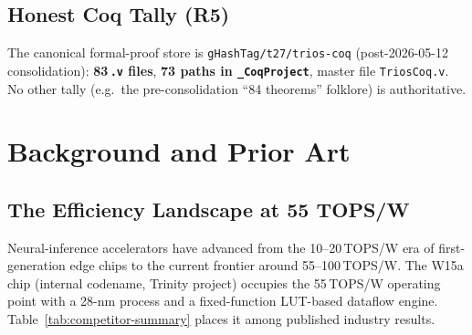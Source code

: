 \subsection{Honest Coq Tally (R5)}

The canonical formal-proof store is
\texttt{gHashTag/t27/trios-coq} (post-2026-05-12 consolidation):
\textbf{83\,\texttt{.v} files}, \textbf{73 paths in \texttt{\_CoqProject}},
master file \texttt{TriosCoq.v}.
No other tally (e.g.\ the pre-consolidation ``84 theorems'' folklore) is authoritative.

\section{Background and Prior Art}
\label{sec:flos77-background}

\subsection{The Efficiency Landscape at 55 TOPS/W}

Neural-inference accelerators have advanced from the 10--20\,TOPS/W era of
first-generation edge chips to the current frontier around 55--100\,TOPS/W.
The W15a chip (internal codename, Trinity project) occupies the 55\,TOPS/W operating point
with a 28-nm process and a fixed-function LUT-based dataflow engine.
Table~\ref{tab:competitor-summary} places it among published industry results.


